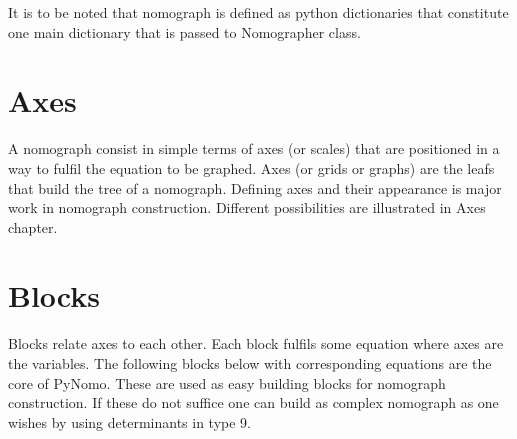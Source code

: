 \documentclass[a4paper,11pt,english]{sphinxmanual}
\begin{document}
It is to be noted that nomograph is defined as python dictionaries that
constitute one main dictionary that is passed to Nomographer class.


\section{Axes}
\label{\detokenize{main_page:axes}}
A nomograph consist in simple terms of axes (or scales) that are positioned in a way to fulfil the equation to be graphed.
Axes (or grids or graphs) are the leafs that build the tree of a nomograph.
Defining axes and their appearance is major work in nomograph
construction. Different possibilities are illustrated in Axes chapter.


\section{Blocks}
\label{\detokenize{main_page:blocks}}
Blocks relate axes to each other. Each block fulfils some equation where axes are the variables.
The following blocks below with corresponding equations are the core of PyNomo.
These are used as easy
building blocks for nomograph construction. If these do not suffice one
can build as complex nomograph as one wishes by using determinants in type 9.
\end{document}
